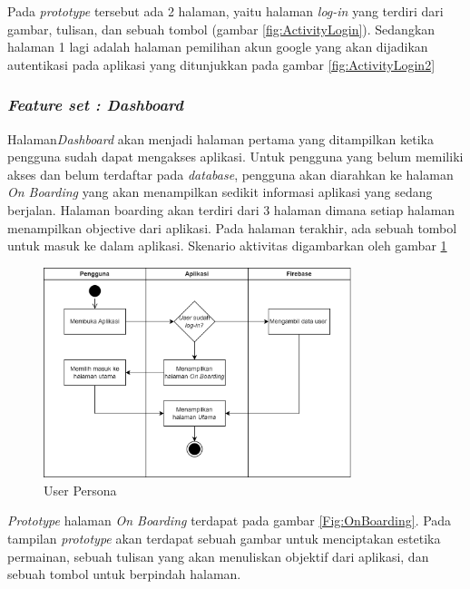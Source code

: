 Pada \textit{prototype} tersebut ada 2 halaman, yaitu halaman \textit{log-in} yang terdiri dari gambar, tulisan, dan sebuah tombol (gambar \ref*{fig:ActivityLogin}).
Sedangkan halaman 1 lagi adalah halaman pemilihan akun google yang akan dijadikan autentikasi pada aplikasi yang ditunjukkan pada gambar \ref*{fig:ActivityLogin2}

\subsubsection{\textit{Feature set : Dashboard}}
Halaman\textit{Dashboard} akan menjadi halaman pertama yang ditampilkan ketika pengguna sudah dapat mengakses aplikasi.
Untuk pengguna yang belum memiliki akses dan belum terdaftar pada \textit{database}, pengguna akan diarahkan ke halaman \textit{On Boarding} yang akan menampilkan sedikit informasi aplikasi yang sedang berjalan.
Halaman boarding akan terdiri dari 3 halaman dimana setiap halaman menampilkan objective dari aplikasi.
Pada halaman terakhir, ada sebuah tombol untuk masuk ke dalam aplikasi. Skenario aktivitas digambarkan oleh gambar \ref*{Fig:ActivityMain}
\begin{figure}[H]
	\centering
	\includegraphics[width=0.8\textwidth]{contents/chapter-3/images/AD-halamanutama.png}
	\caption{User Persona}
	\label{Fig:ActivityMain}
\end{figure}
\textit{Prototype} halaman \textit{On Boarding} terdapat pada gambar \ref*{Fig:OnBoarding}. Pada tampilan \textit{prototype} akan terdapat sebuah gambar untuk menciptakan estetika permainan,
sebuah tulisan yang akan menuliskan objektif dari aplikasi, dan sebuah tombol untuk berpindah halaman.
